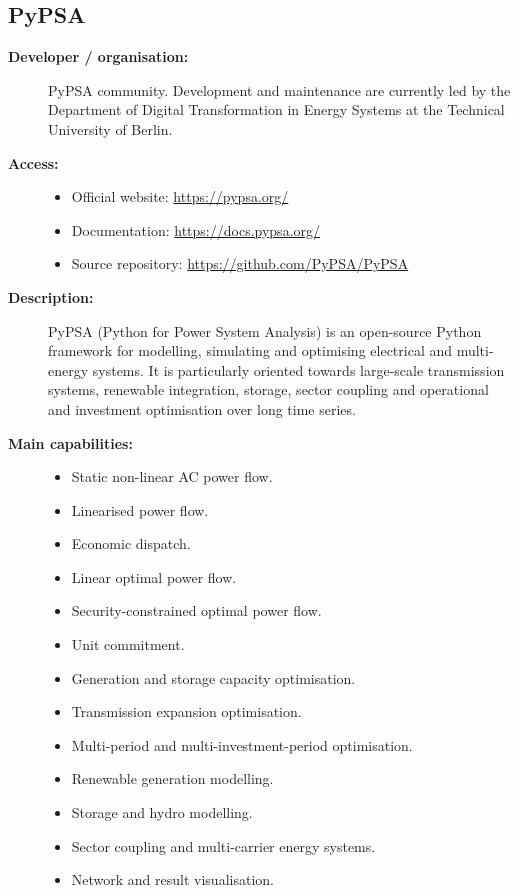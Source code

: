 
\subsection{PyPSA}

\begin{description}

    \item[\textbf{Developer / organisation:}]
    PyPSA community. Development and maintenance are currently led by the
    Department of Digital Transformation in Energy Systems at the Technical
    University of Berlin.

    \item[\textbf{Access:}] \hfill
    \begin{itemize}
        \item Official website:
        \url{https://pypsa.org/}

        \item Documentation:
        \url{https://docs.pypsa.org/}

        \item Source repository:
        \url{https://github.com/PyPSA/PyPSA}
    \end{itemize}

    \item[\textbf{Description:}]
    PyPSA (Python for Power System Analysis) is an open-source Python
    framework for modelling, simulating and optimising electrical and
    multi-energy systems. It is particularly oriented towards large-scale
    transmission systems, renewable integration, storage, sector coupling
    and operational and investment optimisation over long time series.

    \item[\textbf{Main capabilities:}] \hfill
    \begin{itemize}
        \item Static non-linear AC power flow.
        \item Linearised power flow.
        \item Economic dispatch.
        \item Linear optimal power flow.
        \item Security-constrained optimal power flow.
        \item Unit commitment.
        \item Generation and storage capacity optimisation.
        \item Transmission expansion optimisation.
        \item Multi-period and multi-investment-period optimisation.
        \item Renewable generation modelling.
        \item Storage and hydro modelling.
        \item Sector coupling and multi-carrier energy systems.
        \item Network and result visualisation.
    \end{itemize}


\end{description}
